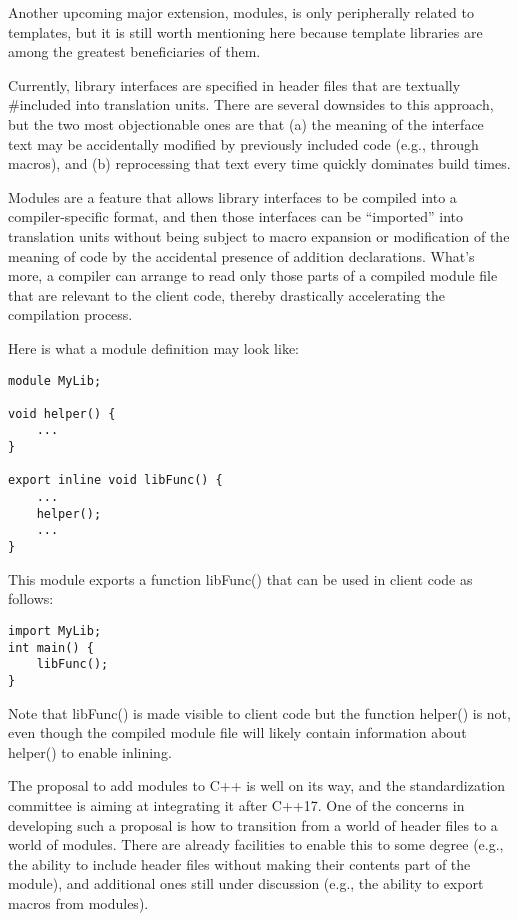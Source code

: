 Another upcoming major extension, modules, is only peripherally related to templates, but it is still worth mentioning here because template libraries are among the greatest beneficiaries of them.

Currently, library interfaces are specified in header files that are textually \#included into translation units. There are several downsides to this approach, but the two most objectionable ones are that (a) the meaning of the interface text may be accidentally modified by previously included code (e.g., through macros), and (b) reprocessing that text every time quickly dominates build times.

Modules are a feature that allows library interfaces to be compiled into a compiler-specific format, and then those interfaces can be “imported” into translation units without being subject to macro expansion or modification of the meaning of code by the accidental presence of addition declarations. What’s more, a compiler can arrange to read only those parts of a compiled module file that are relevant to the client code, thereby drastically accelerating the compilation process.

Here is what a module definition may look like:

\begin{lstlisting}[style=styleCXX]
module MyLib;

void helper() {
	...
}

export inline void libFunc() {
	...
	helper();
	...
}
\end{lstlisting}

This module exports a function libFunc() that can be used in client code as follows:

\begin{lstlisting}[style=styleCXX]
import MyLib;
int main() {
	libFunc();
}
\end{lstlisting}

Note that libFunc() is made visible to client code but the function helper() is not, even though the compiled module file will likely contain information about helper() to enable inlining.

The proposal to add modules to C++ is well on its way, and the standardization committee is aiming at integrating it after C++17. One of the concerns in developing such a proposal is how to transition from a world of header files to a world of modules. There are already facilities to enable this to some degree (e.g., the ability to include header files without making their contents part of the module), and additional ones still under discussion (e.g., the ability to export macros from modules).

